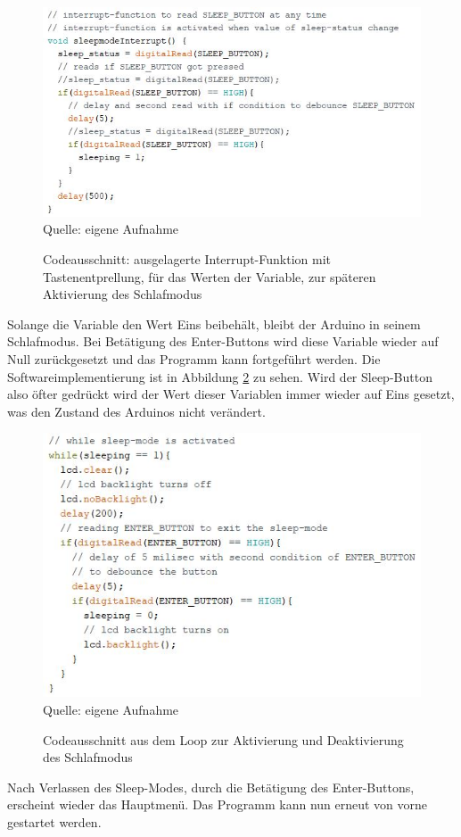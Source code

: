 \begin{figure}[!hbt]
	\centering
	\includegraphics[width=0.8\linewidth]{Images/InterruptFunktion}
	\footnotesize \\Quelle: eigene Aufnahme
	\caption{Codeausschnitt: ausgelagerte Interrupt-Funktion mit Tastenentprellung, für das Werten der Variable, zur späteren Aktivierung des Schlafmodus}
	\label{fig:InterruptFunktion}
\end{figure}
\newpage
Solange die Variable den Wert Eins beibehält, bleibt der Arduino in seinem Schlafmodus. Bei Betätigung des Enter-Buttons wird diese Variable wieder auf Null zurückgesetzt und das Programm kann fortgeführt werden. Die Softwareimplementierung ist in Abbildung \ref{fig:InterruptAktivierung} zu sehen. Wird der Sleep-Button also öfter gedrückt wird der Wert dieser Variablen immer wieder auf Eins gesetzt, was den Zustand des Arduinos nicht verändert. \\
\begin{figure}[!htb]
	\centering
	\includegraphics[width=0.7\linewidth]{Images/InterruptAktivierung}
	\footnotesize \\Quelle: eigene Aufnahme
	\caption{Codeausschnitt aus dem Loop zur Aktivierung und Deaktivierung des Schlafmodus}
	\label{fig:InterruptAktivierung}
\end{figure}
\newline
Nach Verlassen des Sleep-Modes, durch die Betätigung des Enter-Buttons, erscheint wieder das Hauptmenü. Das Programm kann nun erneut von vorne gestartet werden. 